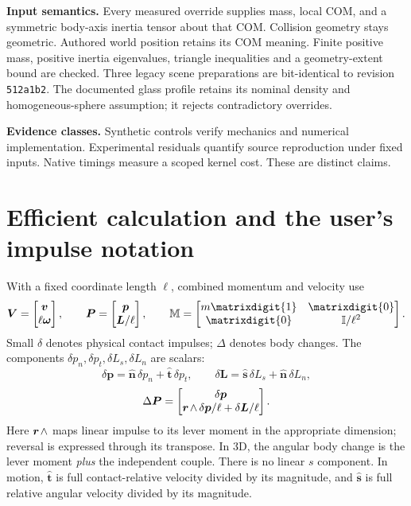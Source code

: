 \documentclass[10pt,a4paper]{article}
\newcommand{\rw}[1]{\mathord{#1\mkern2mu\wedge}}
\newcommand{\id}{\matrixdigit{1}}
\newcommand{\zmat}{\matrixdigit{0}}
\newcommand{\inertia}{\mathbb I}
\begin{document}
\textbf{Input semantics.} Every measured override supplies mass, local COM, and a
symmetric body-axis inertia tensor about that COM. Collision geometry stays
geometric. Authored world position retains its COM meaning. Finite positive mass,
positive inertia eigenvalues, triangle inequalities and a geometry-extent bound
are checked. Three legacy scene preparations are bit-identical to revision
\texttt{512a1b2}. The documented glass profile retains its nominal density and
homogeneous-sphere assumption; it rejects contradictory overrides.

\textbf{Evidence classes.} Synthetic controls verify mechanics and numerical
implementation. Experimental residuals quantify source reproduction under fixed
inputs. Native timings measure a scoped kernel cost. These are distinct claims.
\newpage
\section*{Efficient calculation and the user's impulse notation}
With a fixed coordinate length $\ell$, combined momentum and velocity use
\[
\boldsymbol V=\begin{bmatrix}\boldsymbol v\\\ell\boldsymbol\omega\end{bmatrix},
\qquad \boldsymbol P=\begin{bmatrix}\boldsymbol p\\\boldsymbol L/\ell\end{bmatrix},
\qquad\mathbb M=\begin{bmatrix}m\id&\zmat\\\zmat&\inertia/\ell^2\end{bmatrix}.
\]
Small $\delta$ denotes physical contact impulses; $\Delta$ denotes body changes.
The components $\delta p_n,\delta p_t,\delta L_s,\delta L_n$ are scalars:
\[
\delta\boldsymbol p=\hat{\boldsymbol n}\,\delta p_n+
\hat{\boldsymbol t}\,\delta p_t,\qquad
\delta\boldsymbol L=\hat{\boldsymbol s}\,\delta L_s+
\hat{\boldsymbol n}\,\delta L_n,
\]
\[
\Delta\boldsymbol P=
\begin{bmatrix}\delta\boldsymbol p\\
\rw{\boldsymbol r}\,\delta\boldsymbol p/\ell+\delta\boldsymbol L/\ell
\end{bmatrix}.
\]
Here $\rw{\boldsymbol r}$ maps linear impulse to its lever moment in the
appropriate dimension; reversal is expressed through its transpose. In 3D,
the angular body change is the lever moment \emph{plus} the independent couple.
There is no linear $s$ component. In motion, $\hat{\boldsymbol t}$ is full
contact-relative velocity divided by its magnitude, and $\hat{\boldsymbol s}$
is full relative angular velocity divided by its magnitude.
\end{document}
